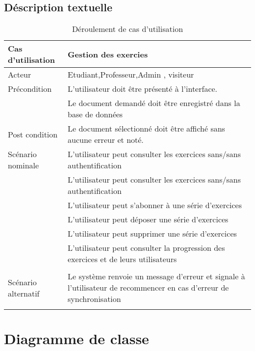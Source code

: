 \subsection{Déscription textuelle}  

\begin{table*}[!h]
    \begin{center} 
    \begin{tabular}{|p{4cm}|p{9cm}|}  \hline 

Cas d'utilisation & Gestion des exercies  \\ \hline
Acteur & Etudiant,Professeur,Admin , visiteur \\ \hline
Précondition & L'utilisateur doit être présenté à l'interface. \\
		   &Le document demandé doit être enregistré dans la base de données      \\ \hline
Post condition & Le document sélectionné doit être affiché sans aucune erreur et noté. 

\\ \hline
       
Scénario nominale & L'utilisateur peut consulter les exercices sans/sans authentification \\  
& L'utilisateur peut consulter les exercices sans/sans authentification \\ 
& L'utilisateur peut s'abonner à une série d'exercices \\ 
& L'utilisateur peut déposer une série d'exercices \\ 
& L'utilisateur peut supprimer une série d'exercices \\ 
& L'utilisateur peut consulter la progression des exercices et de leurs utilisateurs\\ 
                       \\ \hline
                       
Scénario alternatif&      
       Le système renvoie un message d’erreur et
signale à l’utilisateur de recommencer en cas d'erreur de synchronisation\\ 
& 
\\ \hline

  \end{tabular}
  \end{center}
  \caption{ Déroulement de cas d'utilisation}
\label{tab:bert_res}
\end{table*}
\section{Diagramme de classe }

















